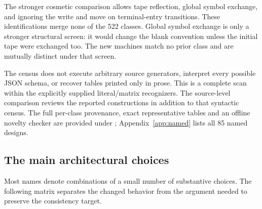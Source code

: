 \documentclass[11pt,letterpaper]{article}
\newcommand{\file}[1]{\path{#1}}
\begin{document}
The stronger cosmetic comparison allows tape reflection, global symbol
exchange, and ignoring the write and move on terminal-entry transitions.
These identifications merge none of the 522 classes. Global symbol
exchange is only a stronger structural screen: it would change the blank
convention unless the initial tape were exchanged too. The new machines
match no prior class and are mutually distinct under that screen.

The census does not execute arbitrary source generators, interpret every
possible JSON schema, or recover tables printed only in prose. This is a
complete scan within the explicitly supplied literal/matrix recognizers.
The source-level comparison reviews the reported constructions in
addition to that syntactic census. The full per-class provenance, exact
representative tables and an offline novelty checker are provided under
\file{comparison/}; Appendix~\ref{app:named} lists all 85 named designs.

\subsection{The main architectural choices}

Most names denote combinations of a small number of substantive choices.
The following matrix separates the changed behavior from the argument
needed to preserve the consistency target.
\end{document}
